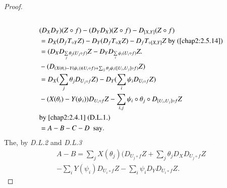 \begin{proof}
\subsection{}\label{chap2:2.5.15}
\begin{align*}
&(D_{X}D_{Y})(Z\circ f)-(D_{Y}D_{X})(Z\circ f)-D_{[X,Y]}(Z\circ f)\\
&=D_{X}(D_{f}T_{\circ Y}Z)-D_{Y}(D_{f}T_{\circ
    X}Z)-D_{f}T_{\circ[X,Y]}Z\text{ by (\ref{chap2:2.5.14})}\\
&=(D_{X}D_{\sum\limits_{j}\theta_{j}(U_{j}\circ
    f)}Z-D_{Y}D_{\sum\limits_{i}\psi_{i}(U_{i}\circ f)}Z.\\
&-(D_{(X(\theta_{i})-Y(\psi_{i}))(U_{i}\circ
    f)+\sum_{ij}\theta_{j}\psi_{i}([U_{i},U_{j}]\circ f)}Z)\\
&=D_{X}(\sum_{j}\theta_{j}D_{U_{j}\circ
    f}Z)-D_{Y}(\sum_{i}\psi_{i}D_{U_{i}\circ f}Z)\\
&-(X(\theta_{i})-Y(\psi_{i}))D_{U_{i}\circ
    f}Z-\sum_{i,j}\psi_{i}\circ\theta_{j}\circ D_{[U_{i},U_{j}]\circ f}Z\\
&\text{by \ref{chap2:2.4.1} (D.L.1.)}\\
&=A-B-C-D\text{ \ say}.
\end{align*}\pageoriginale
The, by {\em D.L.2} and {\em D.L.3}
\begin{gather*}
A-B=\sum_{j}X(\theta_{j})(D_{U_{j}\circ
  f}Z+\sum_{j}\theta_{j}D_{X}D_{U_{j}\circ f}Z\\
-\sum_{i}Y(\psi_{i})D_{U_{i}\circ
  f}Z-\sum_{i}\psi_{i}D_{Y}D_{U_{i}\circ f}Z.
\end{gather*}



\end{proof}
